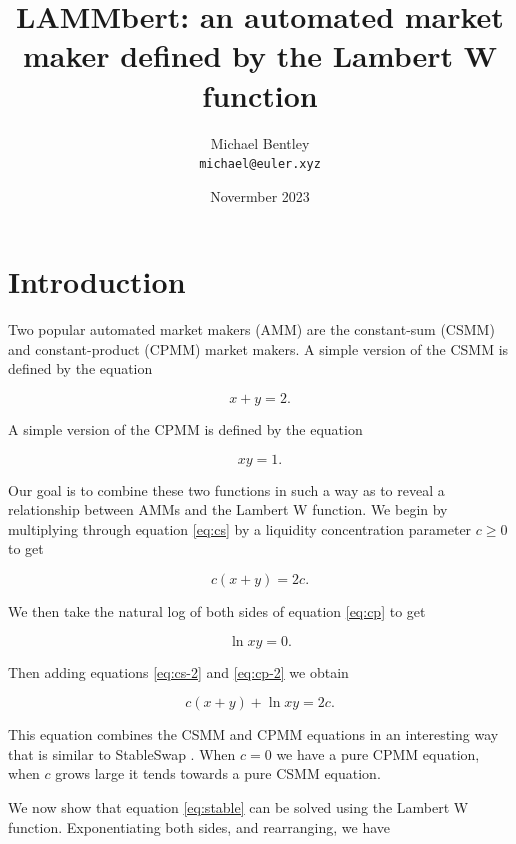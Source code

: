 \documentclass[bibliography=numbered]{article}
\title{LAMMbert: an automated market maker defined by the Lambert W function}
\author{
  Michael Bentley \\
  \texttt{michael@euler.xyz}}
\date{Novermber 2023}
\begin{document}
\maketitle

\section{Introduction}

Two popular automated market makers (AMM) are the constant-sum (CSMM) and constant-product (CPMM) market makers. A simple version of the CSMM is defined by the equation 

\begin{equation}
\label{eq:cs}
    x + y 
    =
    2.
\end{equation}

A simple version of the CPMM is defined by the equation 

\begin{equation}
\label{eq:cp}
    xy 
    = 
    1.
\end{equation}

Our goal is to combine these two functions in such a way as to reveal a relationship between AMMs and the Lambert W function. We begin by multiplying through equation \eqref{eq:cs} by a liquidity concentration parameter $c \geq 0$ to get

\begin{equation}
\label{eq:cs-2}
    c(x + y)
    =
    2c.
\end{equation}

We then take the natural log of both sides of equation \eqref{eq:cp} to get

\begin{equation}
\label{eq:cp-2}
    \ln{xy}
    = 
    0.
\end{equation}

Then adding equations \eqref{eq:cs-2} and \eqref{eq:cp-2} we obtain

\begin{equation}
\label{eq:stable}
    c(x + y) + \ln{xy}
    = 
    2c.
\end{equation}

This equation combines the CSMM and CPMM equations in an interesting way that is similar to StableSwap \cite{egorov2019stableswap}. When $c = 0$ we have a pure CPMM equation, when $c$ grows large it tends towards a pure CSMM equation. 

We now show that equation \eqref{eq:stable} can be solved using the Lambert W function. Exponentiating both sides, and rearranging, we have
\end{document}
